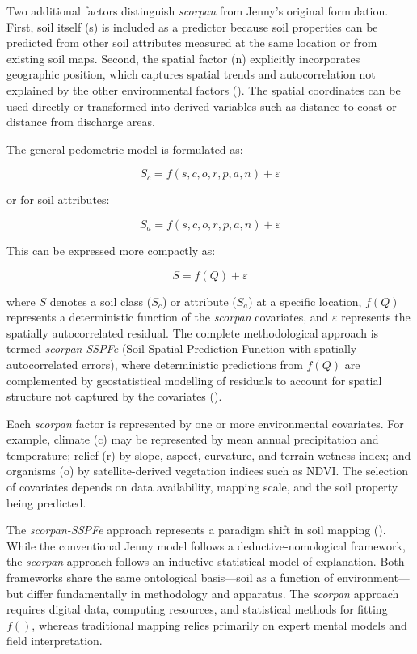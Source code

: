 \documentclass[
  10pt,
  b5paper,
  oneside]{book}
\begin{document}
Two additional factors distinguish \emph{scorpan} from Jenny's original formulation. First, soil itself (s) is included as a predictor because soil properties can be predicted from other soil attributes measured at the same location or from existing soil maps. Second, the spatial factor (n) explicitly incorporates geographic position, which captures spatial trends and autocorrelation not explained by the other environmental factors (). The spatial coordinates can be used directly or transformed into derived variables such as distance to coast or distance from discharge areas.

The general pedometric model is formulated as:

\[S_c = f(s, c, o, r, p, a, n) + \varepsilon\]

or for soil attributes:

\[S_a = f(s, c, o, r, p, a, n) + \varepsilon\]

This can be expressed more compactly as:

\[S = f(Q) + \varepsilon\]

where \(S\) denotes a soil class (\(S_c\)) or attribute (\(S_a\)) at a specific location, \(f(Q)\) represents a deterministic function of the \emph{scorpan} covariates, and \(\varepsilon\) represents the spatially autocorrelated residual. The complete methodological approach is termed \emph{scorpan-SSPFe} (Soil Spatial Prediction Function with spatially autocorrelated errors), where deterministic predictions from \(f(Q)\) are complemented by geostatistical modelling of residuals to account for spatial structure not captured by the covariates ().

Each \emph{scorpan} factor is represented by one or more environmental covariates. For example, climate (c) may be represented by mean annual precipitation and temperature; relief (r) by slope, aspect, curvature, and terrain wetness index; and organisms (o) by satellite-derived vegetation indices such as NDVI. The selection of covariates depends on data availability, mapping scale, and the soil property being predicted.

The \emph{scorpan-SSPFe} approach represents a paradigm shift in soil mapping (). While the conventional Jenny model follows a deductive-nomological framework, the \emph{scorpan} approach follows an inductive-statistical model of explanation. Both frameworks share the same ontological basis---soil as a function of environment---but differ fundamentally in methodology and apparatus. The \emph{scorpan} approach requires digital data, computing resources, and statistical methods for fitting \(f()\), whereas traditional mapping relies primarily on expert mental models and field interpretation.
\end{document}
